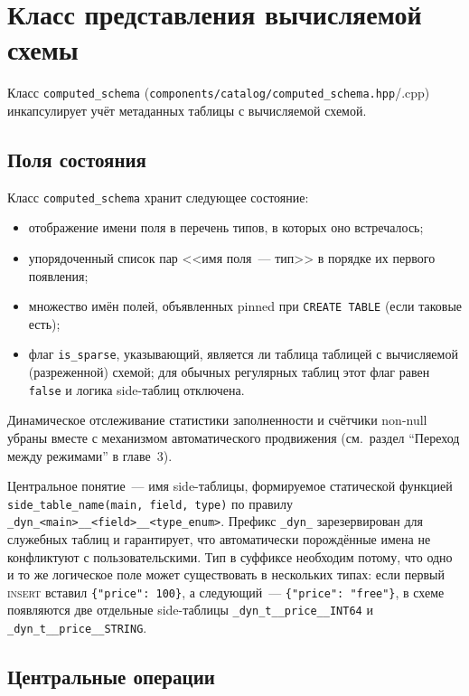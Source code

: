 \section{Класс представления вычисляемой схемы}

Класс \texttt{computed\_schema}
(\texttt{components/catalog/computed\_schema.hpp}/.cpp)
инкапсулирует учёт метаданных таблицы с вычисляемой схемой.

\subsection{Поля состояния}

Класс \texttt{computed\_schema} хранит следующее состояние:

\begin{itemize}
    \item отображение имени поля в перечень типов, в которых оно
    встречалось;
    \item упорядоченный список пар <<имя поля~--- тип>> в порядке
    их первого появления;
    \item множество имён полей, объявленных pinned при
    \texttt{CREATE TABLE} (если таковые есть);
    \item флаг \texttt{is\_sparse}, указывающий, является ли
    таблица таблицей с вычисляемой (разреженной) схемой; для обычных
    регулярных таблиц этот флаг равен \texttt{false} и логика
    side-таблиц отключена.
\end{itemize}

Динамическое отслеживание статистики заполненности и счётчики
non-null убраны вместе с механизмом автоматического продвижения
(см.~раздел ``Переход между режимами'' в главе~3).

Центральное понятие~--- имя side-таблицы, формируемое статической
функцией \texttt{side\_table\_name(main, field, type)} по правилу
\texttt{\_dyn\_<main>\_\_<field>\_\_<type\_enum>}. Префикс
\texttt{\_dyn\_} зарезервирован для служебных таблиц и гарантирует,
что автоматически порождённые имена не конфликтуют с
пользовательскими. Тип в суффиксе необходим потому, что одно и то
же логическое поле может существовать в нескольких типах: если
первый \textsc{insert} вставил \texttt{\{"price":~100\}}, а
следующий~--- \texttt{\{"price":~"free"\}}, в схеме появляются две
отдельные side-таблицы \texttt{\_dyn\_t\_\_price\_\_INT64} и
\texttt{\_dyn\_t\_\_price\_\_STRING}.

\subsection{Центральные операции}

